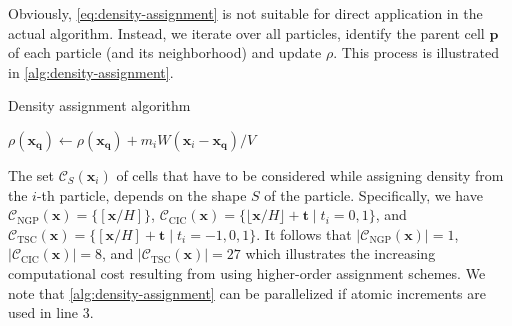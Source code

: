 Obviously, \autoref{eq:density-assignment} is not suitable for direct application in the actual algorithm.
Instead, we iterate over all particles, identify the parent cell $\mathbf{p}$ of each particle (and its neighborhood) and update $\rho$.
This process is illustrated in \autoref{alg:density-assignment}.
\begin{algorithm}
    \caption{Density assignment algorithm}\label{alg:density-assignment}
    \begin{algorithmic}[1]
        \State $\rho(\mathbf{x}_\mathbf{q}) \gets \rho(\mathbf{x}_\mathbf{q}) + m_i W(\mathbf{x}_i - \mathbf{x}_\mathbf{q}) / V$
        \EndFor
        \EndFor
    \end{algorithmic}
\end{algorithm}
The set $\mathcal{C}_S(\mathbf{x}_i)$ of cells that have to be considered while assigning density from the $i$-th particle, depends on the shape $S$ of the particle.
Specifically, we have $\mathcal{C}_\mathrm{NGP}(\mathbf{x}) = \{[\mathbf{x} / H]\}$, $\mathcal{C}_\mathrm{CIC}(\mathbf{x}) = \{\lfloor \mathbf{x}/H \rfloor + \mathbf{t} \;|\; t_i =0,1\}$, and $\mathcal{C}_\mathrm{TSC}(\mathbf{x}) = \{[\mathbf{x} / H] + \mathbf{t} \;|\; t_i = -1, 0, 1\}$.
It follows that $|\mathcal{C}_\mathrm{NGP}(\mathbf{x})| = 1$, $|\mathcal{C}_\mathrm{CIC}(\mathbf{x})| = 8$, and $|\mathcal{C}_\mathrm{TSC}(\mathbf{x})| = 27$ which illustrates the increasing computational cost resulting from using higher-order assignment schemes.
We note that \autoref{alg:density-assignment} can be parallelized if atomic increments are used in line 3.


